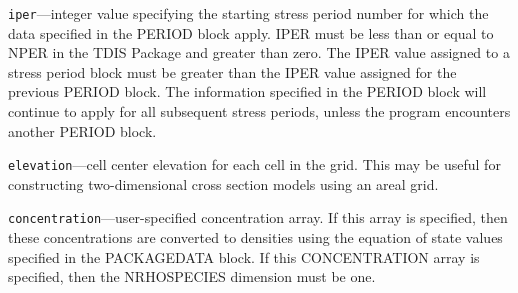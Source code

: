 \begin{description}
\item \texttt{iper}---integer value specifying the starting stress period number for which the data specified in the PERIOD block apply.  IPER must be less than or equal to NPER in the TDIS Package and greater than zero.  The IPER value assigned to a stress period block must be greater than the IPER value assigned for the previous PERIOD block.  The information specified in the PERIOD block will continue to apply for all subsequent stress periods, unless the program encounters another PERIOD block.

\item \texttt{elevation}---cell center elevation for each cell in the grid.  This may be useful for constructing two-dimensional cross section models using an areal grid.

\item \texttt{concentration}---user-specified concentration array.  If this array is specified, then these concentrations are converted to densities using the equation of state values specified in the PACKAGEDATA block.  If this CONCENTRATION array is specified, then the NRHOSPECIES dimension must be one.

\end{description}


